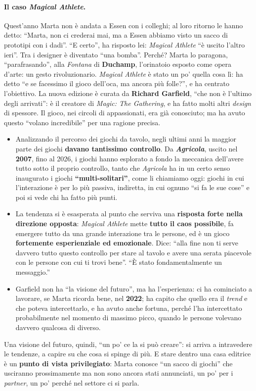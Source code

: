 \paragraph{Il caso \emph{Magical Athlete}.} Quest'anno Marta non è andata a Essen con i
colleghi; al loro ritorno le hanno detto: ``Marta, non ci crederai mai, ma a Essen abbiamo
visto un sacco di prototipi con i dadi''. ``E certo'', ha risposto lei: \emph{Magical
Athlete} ``è uscito l'altro ieri''. Tra i designer è diventato ``una bomba''. Perché? Marta
lo paragona, ``parafrasando'', alla \emph{Fontana} di \textbf{Duchamp}, l'orinatoio esposto
come opera d'arte: un gesto rivoluzionario. \emph{Magical Athlete} è stato un po' quella
cosa lì: ha detto ``e se facessimo il gioco dell'oca, ma ancora più folle?'', e ha
centrato l'obiettivo. La nuova edizione è curata da \textbf{Richard Garfield}, ``che non è
l'ultimo degli arrivati'': è il creatore di \emph{Magic: The Gathering}, e ha fatto molti
altri \emph{design} di spessore. Il gioco, nei circoli di appassionati, era già conosciuto;
ma ha avuto questo ``volano incredibile'' per una ragione precisa.
\begin{itemize}
  \item Analizzando il percorso dei giochi da tavolo, negli ultimi anni la maggior parte
        dei giochi \textbf{davano tantissimo controllo}. Da \textbf{\emph{Agricola}}, uscito
        nel \textbf{2007}, fino al 2026, i giochi hanno esplorato a fondo la meccanica
        dell'avere tutto sotto il proprio controllo, tanto che \emph{Agricola} ha in un
        certo senso inaugurato i giochi \textbf{``multi-solitari''}, come li chiamiamo oggi:
        giochi in cui l'interazione è per lo più passiva, indiretta, in cui ognuno ``si fa
        le sue cose'' e poi si vede chi ha fatto più punti.
  \item La tendenza si è esasperata al punto che serviva una \textbf{risposta forte nella
        direzione opposta}: \emph{Magical Athlete} mette \textbf{tutto il caos possibile},
        fa emergere tutto da una grande interazione tra le persone, ed è un gioco
        \textbf{fortemente esperienziale ed emozionale}. Dice: ``alla fine non ti serve
        davvero tutto questo controllo per stare al tavolo e avere una serata piacevole
        con le persone con cui ti trovi bene''. ``È stato fondamentalmente un messaggio.''
  \item Garfield non ha ``la visione del futuro'', ma ha l'esperienza: ci ha cominciato a
        lavorare, se Marta ricorda bene, nel \textbf{2022}; ha capito che quello era il
        \emph{trend} e che poteva intercettarlo, e ha avuto anche fortuna, perché l'ha
        intercettato probabilmente nel momento di massimo picco, quando le persone
        volevano davvero qualcosa di diverso.
\end{itemize}
Una visione del futuro, quindi, ``un po' ce la si può creare'': si arriva a intravedere le
tendenze, a capire su che cosa si spinge di più. E stare dentro una casa editrice è un
\textbf{punto di vista privilegiato}: Marta conosce ``un sacco di giochi'' che usciranno
prossimamente ma non sono ancora stati annunciati, un po' per i \emph{partner}, un po'
perché nel settore ci si parla.

